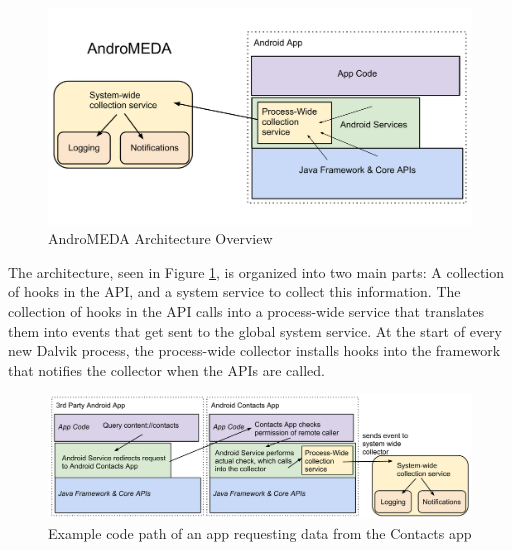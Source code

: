
\begin{figure}[t]
\begin{center}
\includegraphics[width=1.0\columnwidth]{figs/AndroMEDA-Architecture-Overview}
\caption{AndroMEDA Architecture Overview}
\label{fig:andromedaoverview}
\end{center}
\end{figure}

The architecture, seen in Figure \ref{fig:andromedaoverview}, is organized into two main parts: A collection of hooks in the API, and a system service to collect this information. The collection of hooks in the API calls into a process-wide service that translates them into events that get sent to the global system service. At the start of every new Dalvik process, the process-wide collector installs hooks into the framework that notifies the collector when the APIs are called.

\begin{figure}[t]
\begin{center}
\includegraphics[width=1.0\columnwidth]{figs/AndroMEDA-Inter-App-Example}
\caption{Example code path of an app requesting data from the Contacts app}
\label{fig:interapp-example}
\end{center}
\end{figure}

